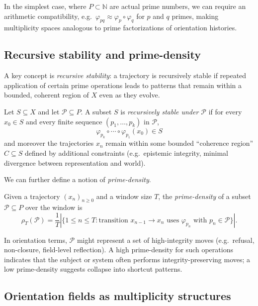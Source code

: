 \documentclass[11pt]{article}
\begin{document}
In the simplest case, where \(P \subset \mathbb{N}\) are actual prime numbers, we can require an arithmetic compatibility, e.g.\ \(\varphi_{p q} \approx \varphi_p \circ \varphi_q\) for \(p\) and \(q\) primes, making multiplicity spaces analogous to prime factorizations of orientation histories.

\subsection{Recursive stability and prime-density}

A key concept is \emph{recursive stability}: a trajectory is recursively stable if repeated application of certain prime operations leads to patterns that remain within a bounded, coherent region of \(X\) even as they evolve.

\begin{definition}
Let \(S \subseteq X\) and let \(\mathcal{P} \subseteq P\). A subset \(S\) is \emph{recursively stable under \(\mathcal{P}\)} if for every \(x_0 \in S\) and every finite sequence \((p_1, \dots, p_k)\) in \(\mathcal{P}\),
\[
\varphi_{p_k} \circ \cdots \circ \varphi_{p_1}(x_0) \in S
\]
and moreover the trajectories \(x_n\) remain within some bounded ``coherence region'' \(C \subseteq S\) defined by additional constraints (e.g.\ epistemic integrity, minimal divergence between representation and world).
\end{definition}

We can further define a notion of \emph{prime-density}.

\begin{definition}
Given a trajectory \((x_n)_{n \ge 0}\) and a window size \(T\), the \emph{prime-density} of a subset \(\mathcal{P} \subseteq P\) over the window is
\[
\rho_T(\mathcal{P}) = \frac{1}{T} \left| \{ 1 \le n \le T : \text{transition } x_{n-1} \to x_n \text{ uses } \varphi_{p_n} \text{ with } p_n \in \mathcal{P} \} \right|.
\]
\end{definition}

In orientation terms, \(\mathcal{P}\) might represent a set of high-integrity moves (e.g.\ refusal, non-closure, field-level reflection). A high prime-density for such operations indicates that the subject or system often performs integrity-preserving moves; a low prime-density suggests collapse into shortcut patterns.

\subsection{Orientation fields as multiplicity structures}
\end{document}
